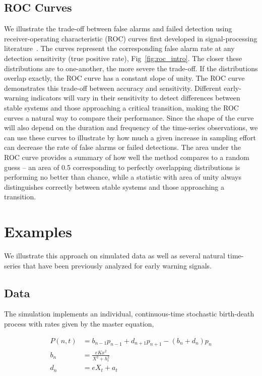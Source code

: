 \documentclass[authoryear,preprint,11pt]{elsarticle}
\begin{document}
\subsection{ROC Curves}
We illustrate the trade-off between false alarms and failed detection using 
receiver-operating characteristic (ROC) curves first developed in signal-processing literature~\citep{Green1989, Keller2009}⁠. 
The curves represent the corresponding false alarm rate at any detection sensitivity (true positive rate), Fig~\ref{fig:roc_intro}.
The closer these distributions are to one-another, the more severe the trade-off.  
If the distributions overlap exactly, the ROC curve has a constant slope of unity.  
The ROC curve demonstrates this trade-off between accuracy and sensitivity.  
Different early-warning indicators will vary in their sensitivity to detect differences
between stable systems and those approaching a critical transition,
making the ROC curves a natural way to compare their performance.  
Since the shape of the curve will also depend on the duration and frequency of the time-series observations,
we can use these curves to illustrate by how much a given increase in sampling effort can decrease the rate of false alarms or failed detections.  
The area under the ROC curve provides a summary of how well the method compares to a random guess --
an area of 0.5 corresponding to perfectly overlapping distributions is performing no better than chance,
while a statistic with area of unity always distinguishes correctly between stable systems and those approaching a transition. 



\section{Examples}
We illustrate this approach on simulated data as well as several natural time-series that have been previously analyzed for early warning signals.  

\subsection*{Data}
The simulation implements an individual, continuous-time stochastic birth-death process with rates given by the master equation,

\begin{align}
    P(n,t) &= b_{n-1} p_{n-1} + d_{n+1}p_{n+1} - (b_n+d_n)p_n  \label{master} \\ 
    b_n &= \frac{e K x^2}{X^2 + h_t^2} \\ 
    d_n &= e X_t + a_t   
\end{align}
\end{document}
